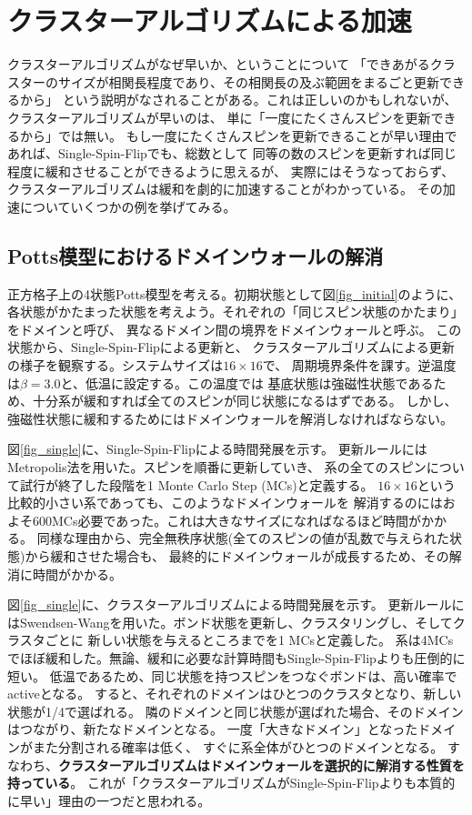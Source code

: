\documentclass{jarticle}
\begin{document}
\section{クラスターアルゴリズムによる加速}

クラスターアルゴリズムがなぜ早いか、ということについて
「できあがるクラスターのサイズが相関長程度であり、その相関長の及ぶ範囲をまるごと更新できるから」
という説明がなされることがある。これは正しいのかもしれないが、クラスターアルゴリズムが早いのは、
単に「一度にたくさんスピンを更新できるから」では無い。
もし一度にたくさんスピンを更新できることが早い理由であれば、Single-Spin-Flipでも、総数として
同等の数のスピンを更新すれば同じ程度に緩和させることができるように思えるが、
実際にはそうなっておらず、クラスターアルゴリズムは緩和を劇的に加速することがわかっている。
その加速についていくつかの例を挙げてみる。

\subsection{Potts模型におけるドメインウォールの解消}

正方格子上の4状態Potts模型を考える。初期状態として図\ref{fig_initial}のように、
各状態がかたまった状態を考えよう。それぞれの「同じスピン状態のかたまり」をドメインと呼び、
異なるドメイン間の境界をドメインウォールと呼ぶ。
この状態から、Single-Spin-Flipによる更新と、
クラスターアルゴリズムによる更新の様子を観察する。システムサイズは$16 \times 16$で、
周期境界条件を課す。逆温度は$\beta = 3.0$と、低温に設定する。この温度では
基底状態は強磁性状態であるため、十分系が緩和すれば全てのスピンが同じ状態になるはずである。
しかし、強磁性状態に緩和するためにはドメインウォールを解消しなければならない。

図\ref{fig_single}に、Single-Spin-Flipによる時間発展を示す。
更新ルールにはMetropolis法を用いた。スピンを順番に更新していき、
系の全てのスピンについて試行が終了した段階を1 Monte Carlo Step (MCs)と定義する。
$16 \times 16$という比較的小さい系であっても、このようなドメインウォールを
解消するのにはおよそ600MCs必要であった。これは大きなサイズになればなるほど時間がかかる。
同様な理由から、完全無秩序状態(全てのスピンの値が乱数で与えられた状態)から緩和させた場合も、
最終的にドメインウォールが成長するため、その解消に時間がかかる。

図\ref{fig_single}に、クラスターアルゴリズムによる時間発展を示す。
更新ルールにはSwendsen-Wangを用いた。ボンド状態を更新し、クラスタリングし、そしてクラスタごとに
新しい状態を与えるところまでを1 MCsと定義した。
系は4MCsでほぼ緩和した。無論、緩和に必要な計算時間もSingle-Spin-Flipよりも圧倒的に短い。
低温であるため、同じ状態を持つスピンをつなぐボンドは、高い確率でactiveとなる。
すると、それぞれのドメインはひとつのクラスタとなり、新しい状態が1/4で選ばれる。
隣のドメインと同じ状態が選ばれた場合、そのドメインはつながり、新たなドメインとなる。
一度「大きなドメイン」となったドメインがまた分割される確率は低く、
すぐに系全体がひとつのドメインとなる。
すなわち、\textbf{クラスターアルゴリズムはドメインウォールを選択的に解消する性質を持っている}。
これが「クラスターアルゴリズムがSingle-Spin-Flipよりも本質的に早い」理由の一つだと思われる。
\end{document}
